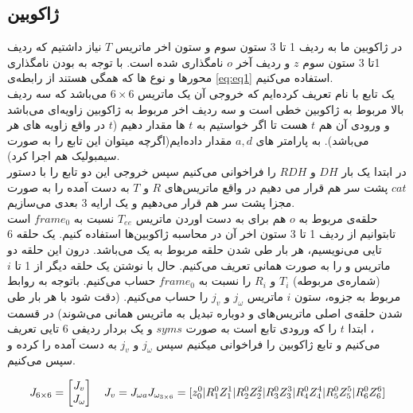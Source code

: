 \documentclass{article}
\begin{document}
\subsection{ژاکوبین }
در ژاکوبین   ما به ردیف 1 تا 3 ستون سوم و ستون اخر ماتریس $T$ نیاز داشتیم که ردیف 1تا 3 ستون سوم $z$ و ردیف آخر $o$ نامگذاری شده است.
با توجه به   بودن نامگذاری محور‌ها و نوع   ها که همگی   هستند از رابطه‌ی \ref{eq:eq1} استفاده می‌کنیم.
\\
یک تابع با نام  تعریف کرده‌ایم که خروجی آن یک ماتریس  $6\times6$ می‌باشد که سه ردیف بالا مربوط به ژاکوبین خطی است و سه ردیف اخر مربوط به ژاکوبین زاویه‌ای می‌باشد و ورودی آن هم $t$  هست تا اگر خواستیم به $t$ ها مقدار دهیم ($t$ در واقع زاویه های هر  می‌باشد).
به پارامتر های $a, d$ مقدار داده‌ایم(اگرچه میتوان این تابع را به صورت سیمبولیک هم اجرا کرد).
\\
در ابتدا یک بار $DH$ و $RDH$ را فراخوانی می‌کنیم سپس خروجی این دو تابع را با دستور $cat$ پشت سر هم قرار می دهیم در واقع ماتریس‌های $R$ و $T$ به دست آمده را به صورت مجزا پشت سر هم قرار می‌دهیم و یک ارایه 3 بعدی می‌سازیم.
\\
حلقه‌ی مربوط به $o$ هم برای به دست اوردن ماتریس $T_{ee}$ نسبت به $frame_{0}$ است تابتوانیم از ردیف 1 تا 3 ستون اخر آن در محاسبه  ژاکوبین‌ها استفاده کنیم.
یک حلقه 6 تایی می‌نویسیم، هر بار طی شدن حلقه مربوط به یک   می‌باشد. درون این حلقه دو ماتریس  و   را به صورت همانی تعریف می‌کنیم. حال با نوشتن یک حلقه دیگر از 1 تا $i$ (شماره‌ی  مربوطه) $T_{i}$ و $R_{i}$ را نسبت به $frame_{0}$ حساب می‌کنیم. باتوجه به روابط مربوط به جزوه، ستون $i$ ماتریس $j_{\omega}$ و $j_{v}$ را حساب می‌کنیم. (دقت شود با هر بار طی شدن حلقه‌ی اصلی ماتریس‌های  و   دوباره تبدیل به ماتریس همانی می‌شوند)
در قسمت   ،  ابتدا $t$ را که ورودی تابع است به صورت $syms$ و یک بردار ردیفی 6 تایی تعریف می‌کنیم و  تابع ژاکوبین را فراخوانی میکنیم سپس $j_{\omega}$ و $j_{v}$ به دست آمده را  کرده و سپس  می‌کنیم.

\begin{equation}
J_{6 \times 6} = \begin{bmatrix}
J_{v} \\
J_{\omega}
\end{bmatrix}
\quad
J_{v} = J_{\omega a} \\
J_{\omega_{3 \times 6}} = [z_{0}^{0} | R_{1}^{0} Z_{1}^{1} | R_{2}^{0} Z_{2}^{2} | R_{3}^{0} Z_{3}^{3} | R_{4}^{0} Z_{4}^{4} | R_{5}^{0} Z_{5}^{5} | R_{6}^{0} Z_{6}^{6}]
\label{eq:eq1}
\end{equation}
\end{document}
